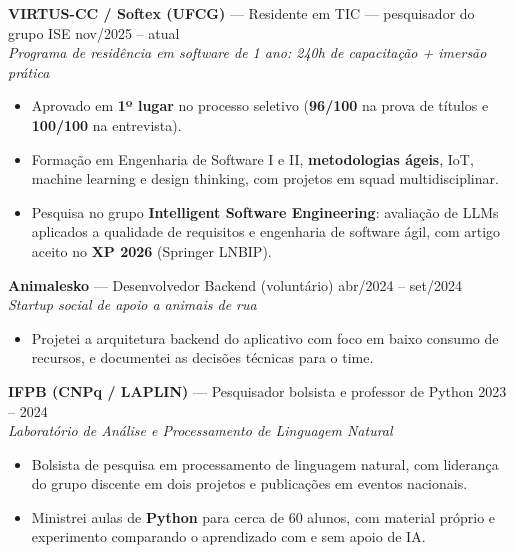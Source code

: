 \documentclass[10.5pt,a4paper]{article}
\newcommand{\cargo}[4]{%
  \Needspace*{5\baselineskip}%
  \textbf{#1} \textnormal{---} #2 \hfill \textnormal{#3}\\
  \textit{\small #4}\vspace{0.4ex}
}
\begin{document}
\cargo{VIRTUS-CC / Softex (UFCG)}{Residente em TIC --- pesquisador do grupo ISE}{nov/2025 --
atual}{Programa de residência em software de 1 ano: 240h de capacitação + imersão prática}
\begin{itemize}
  \item Aprovado em \textbf{1º lugar} no processo seletivo (\textbf{96/100} na prova de títulos e
        \textbf{100/100} na entrevista).
  \item Formação em Engenharia de Software I e II, \textbf{metodologias ágeis}, IoT, machine
        learning e design thinking, com projetos em squad multidisciplinar.
  \item Pesquisa no grupo \textbf{Intelligent Software Engineering}: avaliação de LLMs aplicados a
        qualidade de requisitos e engenharia de software ágil, com artigo aceito no
        \textbf{XP 2026} (Springer LNBIP).
\end{itemize}

\cargo{Animalesko}{Desenvolvedor Backend (voluntário)}{abr/2024 -- set/2024}{Startup social de apoio
a animais de rua}
\begin{itemize}
  \item Projetei a arquitetura backend do aplicativo com foco em baixo consumo de recursos, e
        documentei as decisões técnicas para o time.
\end{itemize}

\cargo{IFPB (CNPq / LAPLIN)}{Pesquisador bolsista e professor de Python}{2023 -- 2024}{Laboratório de
Análise e Processamento de Linguagem Natural}
\begin{itemize}
  \item Bolsista de pesquisa em processamento de linguagem natural, com liderança do grupo discente
        em dois projetos e publicações em eventos nacionais.
  \item Ministrei aulas de \textbf{Python} para cerca de 60 alunos, com material próprio e
        experimento comparando o aprendizado com e sem apoio de IA.
\end{itemize}

\end{document}
